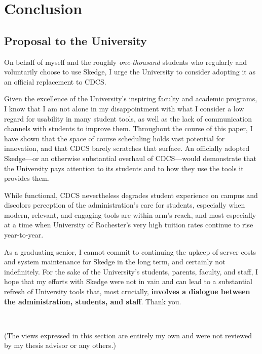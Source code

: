
\chapter{Conclusion}

\vspace{-20pt}
\section{Proposal to the University}

On behalf of myself and the roughly \emph{one-thousand} students who regularly and voluntarily choose to use Skedge, I urge the University to consider adopting it as an official replacement to CDCS.

Given the excellence of the University's inspiring faculty and academic programs, I know that I am not alone in my disappointment with what I consider a low regard for usability in many student tools, as well as the lack of communication channels with students to improve them. Throughout the course of this paper, I have shown that the space of course scheduling holds vast potential for innovation, and that CDCS barely scratches that surface. An officially adopted Skedge---or an otherwise substantial overhaul of CDCS---would demonstrate that the University pays attention to its students and to how they use the tools it provides them.

While functional, CDCS nevertheless degrades student experience on campus and discolors perception of the administration's care for students, especially when modern, relevant, and engaging tools are within arm's reach, and most especially at a time when University of Rochester's very high tuition rates continue to rise year-to-year.

As a graduating senior, I cannot commit to continuing the upkeep of server costs and system maintenance for Skedge in the long term, and certainly not indefinitely. For the sake of the University's students, parents, faculty, and staff, I hope that my efforts with Skedge were not in vain and can lead to a substantial refresh of University tools that, most crucially, \textbf{involves a dialogue between the administration, students, and staff}. Thank you.

\\
\vspace{10pt}

\noindent (The views expressed in this section are entirely my own and were not reviewed by my thesis advisor or any others.)


